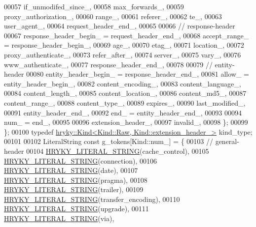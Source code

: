 \begin{DoxyCode}
00057             if\_unmodifed\_since\_,
00058             max\_forwards\_,
00059             proxy\_authorization\_,
00060             range\_,
00061             referer\_,
00062             te\_,
00063             user\_agent\_,
00064             request\_header\_end\_,
00065 
00066             \textcolor{comment}{// response-header}
00067             response\_header\_begin\_  = request\_header\_end\_,
00068             accept\_range\_           = response\_header\_begin\_,
00069             age\_,
00070             etag\_,
00071             location\_,
00072             proxy\_authenticate\_,
00073             refer\_after\_,
00074             server\_,
00075             vary\_,
00076             www\_authenticate\_,
00077             response\_header\_end\_,
00078 
00079             \textcolor{comment}{// entity-header}
00080             entity\_header\_begin\_    = response\_header\_end\_,
00081             allow\_                  = entity\_header\_begin\_,
00082             content\_encoding\_,
00083             content\_language\_,
00084             content\_length\_,
00085             content\_location\_,
00086             content\_md5\_,
00087             content\_range\_,
00088             content\_type\_,
00089             expires\_,
00090             last\_modified\_,
00091             entity\_header\_end\_,
00092             end\_                    = entity\_header\_end\_,
00093 
00094             num\_                    = end\_,
00095 
00096             extension\_header\_,
00097             invalid\_,
00098         \};
00099     \};
00100     \textcolor{keyword}{typedef} \hyperlink{classhryky_1_1_kind}{hryky::Kind<Kind::Raw, Kind::extension_header_>} kind\_type;
00101 
00102     LiteralString \textcolor{keyword}{const} g\_tokens[Kind::num\_] = \{
00103         \textcolor{comment}{// general-header}
00104         \hyperlink{common_8h_a9ab2728caa46163f328bd32fe4d9ff12}{HRYKY_LITERAL_STRING}(cache\_control),
00105         \hyperlink{common_8h_a9ab2728caa46163f328bd32fe4d9ff12}{HRYKY_LITERAL_STRING}(connection),
00106         \hyperlink{common_8h_a9ab2728caa46163f328bd32fe4d9ff12}{HRYKY_LITERAL_STRING}(date),
00107         \hyperlink{common_8h_a9ab2728caa46163f328bd32fe4d9ff12}{HRYKY_LITERAL_STRING}(pragma),
00108         \hyperlink{common_8h_a9ab2728caa46163f328bd32fe4d9ff12}{HRYKY_LITERAL_STRING}(trailer),
00109         \hyperlink{common_8h_a9ab2728caa46163f328bd32fe4d9ff12}{HRYKY_LITERAL_STRING}(transfer\_encoding),
00110         \hyperlink{common_8h_a9ab2728caa46163f328bd32fe4d9ff12}{HRYKY_LITERAL_STRING}(upgrade),
00111         \hyperlink{common_8h_a9ab2728caa46163f328bd32fe4d9ff12}{HRYKY_LITERAL_STRING}(via),

\end{DoxyCode}
